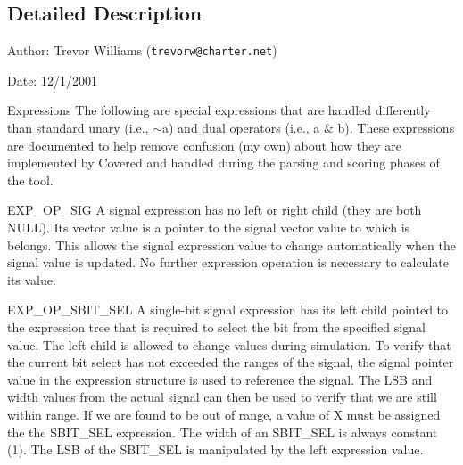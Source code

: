 \subsection{Detailed Description}
\begin{Desc}
\item[Author:]Trevor Williams ({\tt trevorw@charter.net}) \end{Desc}
\begin{Desc}
\item[Date:]12/1/2001\end{Desc}
\begin{Desc}
\item[Expressions]The following are special expressions that are handled differently than standard unary (i.e., $\sim$a) and dual operators (i.e., a \& b). These expressions are documented to help remove confusion (my own) about how they are implemented by Covered and handled during the parsing and scoring phases of the tool.\end{Desc}
\begin{Desc}
\item[EXP\_\-OP\_\-SIG]A signal expression has no left or right child (they are both NULL). Its vector value is a pointer to the signal vector value to which is belongs. This allows the signal expression value to change automatically when the signal value is updated. No further expression operation is necessary to calculate its value.\end{Desc}
\begin{Desc}
\item[EXP\_\-OP\_\-SBIT\_\-SEL]A single-bit signal expression has its left child pointed to the expression tree that is required to select the bit from the specified signal value. The left child is allowed to change values during simulation. To verify that the current bit select has not exceeded the ranges of the signal, the signal pointer value in the expression structure is used to reference the signal. The LSB and width values from the actual signal can then be used to verify that we are still within range. If we are found to be out of range, a value of X must be assigned the the SBIT\_\-SEL expression. The width of an SBIT\_\-SEL is always constant (1). The LSB of the SBIT\_\-SEL is manipulated by the left expression value.\end{Desc}
